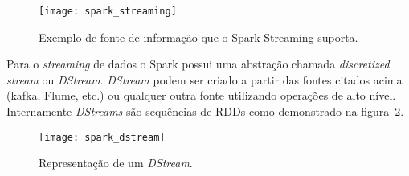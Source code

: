 \begin{figure}[!h]
	\caption{\label{fig:sparkstreaming} Exemplo de fonte de informação que o Spark Streaming suporta.}
	\begin{center}
		\texttt{[image: spark\_streaming]}
	\end{center}
\end{figure}

Para o \textit{streaming} de dados o Spark possui uma abstração chamada \textit{discretized stream} ou \textit{DStream}. \textit{DStream} podem ser criado a partir das fontes citados acima (kafka, Flume, etc.) ou qualquer outra fonte utilizando operações de alto nível. Internamente \textit{DStreams} são sequências de RDDs como demonstrado na figura~\ref{fig:sparkdstream}.

\begin{figure}[!h]
	\caption{\label{fig:sparkdstream} Representação de um \textit{DStream}.}
	\begin{center}
		\texttt{[image: spark\_dstream]}
	\end{center}
\end{figure}
